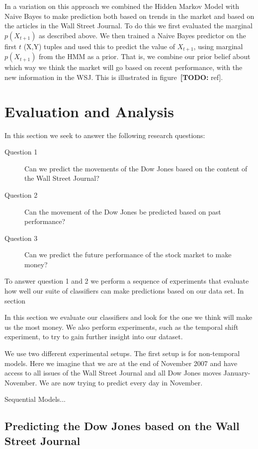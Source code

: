 \documentclass[10pt]{article}
\def\TODO#1{\noindent\textbf{[TODO:} #1]}
\begin{document}
In a variation on this approach we combined the Hidden Markov Model with Naive Bayes to make prediction both based on trends in the market and based on the articles in the Wall Street Journal.
To do this we first evaluated the marginal $p(X_{t+1})$ as described above.
We then trained a Naive Bayes predictor on the first $t$ (X,Y) tuples and used this to predict the value of $X_{t+1}$, using marginal $p(X_{t+1})$ from the HMM as a prior.
That is, we combine our prior belief about which way we think the market will go based on recent performance, with the new information in the WSJ.
This is illustrated in figure~\TODO{ref}. 


\section{Evaluation and Analysis}

In this section we seek to answer the following research questions:
\begin{description}
\item[Question 1] Can we predict the movements of the Dow Jones based on the content of the Wall Street Journal?
\item[Question 2] Can the movement of the Dow Jones be predicted based on past performance?
\item[Question 3] Can we predict the future performance of the stock market to make money?
\end{description}

To answer question 1 and 2 we perform a sequence of experiments that evaluate how well our suite of classifiers can make predictions based on our data set.
In section~


In this section we evaluate our classifiers and look for the one we think will make us the most money.
We also perform experiments, such as the temporal shift experiment, to try to gain further insight into our dataset.

We use two different experimental setups.
The first setup is for non-temporal models.
Here we imagine that we are at the end of November 2007 and have access to all issues of the Wall Street Journal and all Dow Jones moves January-November.
We are now trying to predict every day in November.

Sequential Models...

\subsection{Predicting the Dow Jones based on the Wall Street Journal}
\end{document}
